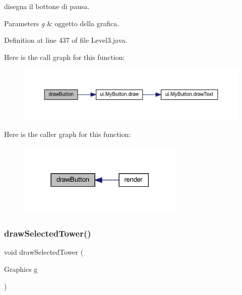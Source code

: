 disegna il bottone di pausa. 


\begin{DoxyParams}{Parameters}
{\em g} & oggetto della grafica. \\
\hline
\end{DoxyParams}


Definition at line 437 of file Level3.\+java.

Here is the call graph for this function\+:\nopagebreak
\begin{figure}[H]
\begin{center}
\leavevmode
\includegraphics[width=350pt]{classscenes_1_1_level3_a65768678909bc0512c6cb9780709ad38_cgraph}
\end{center}
\end{figure}
Here is the caller graph for this function\+:\nopagebreak
\begin{figure}[H]
\begin{center}
\leavevmode
\includegraphics[width=225pt]{classscenes_1_1_level3_a65768678909bc0512c6cb9780709ad38_icgraph}
\end{center}
\end{figure}
\mbox{\label{classscenes_1_1_level3_a0a97d0bb6d32640b2ae351707946abf7}} 
\subsubsection{\texorpdfstring{draw\+Selected\+Tower()}{drawSelectedTower()}}
{\footnotesize\ttfamily void draw\+Selected\+Tower (\begin{DoxyParamCaption}\item[{Graphics}]{g }\end{DoxyParamCaption})\hspace{0.3cm}{\ttfamily [private]}}



